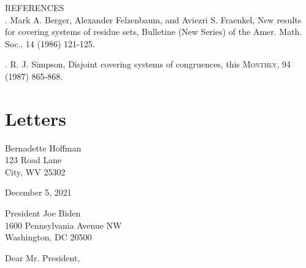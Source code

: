 \documentclass[oneside]{book}
\begin{document}
\bigskip

\noindent REFERENCES\\
. Mark A. Berger, Alexander Felzenbaum, and Aviezri S. Fraenkel, New results for covering systems of residue sets, Bulletine (New Series) of the Amer. Math. Soc., 14 (1986) 121-125.

. R. J. Simpson, Disjoint covering systems of congruences, this \textsc{Monthly}, 94 (1987) 865-868.\\

\cite{ConjectureSimpson}


\chapter{Letters}
\begin{flushleft}

Bernadette Hoffman\\
123 Road Lane\\
City, WV 25302\\
\vspace{.25in}

December 5, 2021\\
\vspace{.25in}

President Joe Biden\\
1600 Pennsylvania Avenue NW\\
Washington, DC 20500\\
\vspace{.25in}

Dear Mr. President,\\
\vspace{.25in}


\end{flushleft}
\end{document}
